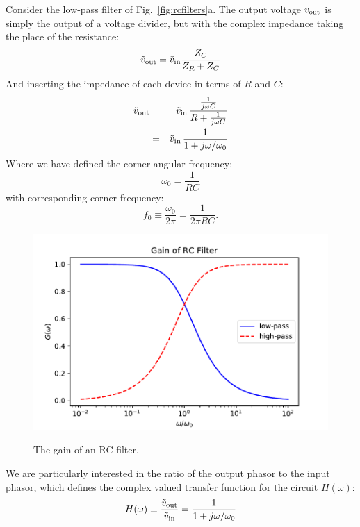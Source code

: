 \documentclass[12pt,oneside]{book}
\begin{document}
Consider the low-pass filter of Fig.~\ref{fig:rcfilters}a.   The output voltage $v_{\rm out}$ is simply the output of a voltage divider, but with the complex impedance taking the place of the resistance:
\begin{displaymath}
\tilde{v}_{\rm out} = \tilde{v}_{\rm in} \frac{Z_C}{Z_R + Z_C}
\end{displaymath}
And inserting the impedance of each device in terms of $R$ and $C$:
\begin{eqnarray*}
\tilde{v}_{\rm out} &=& \tilde{v}_{\rm in} \, \frac{\frac{1}{j \omega C}}{R + \frac{1}{j \omega C}}\\
&=& \tilde{v}_{\rm in} \, \frac{1}{1 + j \omega/\omega_0}\\
\end{eqnarray*}
Where we have defined the corner angular frequency: 
\begin{equation*}
\omega_0 = \frac{1}{RC}
\end{equation*}  
with corresponding corner frequency:
\begin{equation*}
f_0  \equiv \frac{\omega_0}{2\pi} = \frac{1}{2 \pi RC}.
\end{equation*}  
\begin{figure}[htbp]
\begin{center}
\includegraphics[height=0.3\textheight]{figs/rcgain.pdf} \\
\caption{ The gain of an RC filter.}
\label{fig:rcgain}
\end{center}
\end{figure}
We are particularly interested in the ratio of the output phasor to the input phasor, which defines the complex valued transfer function for the circuit $H(\omega)$:
\begin{equation*}
H(\omega) \equiv \frac{\tilde{v}_{\rm out}}{\tilde{v}_{\rm in}} = \frac{1}{1 + j \omega/\omega_0}\\
\end{equation*}
\end{document}
